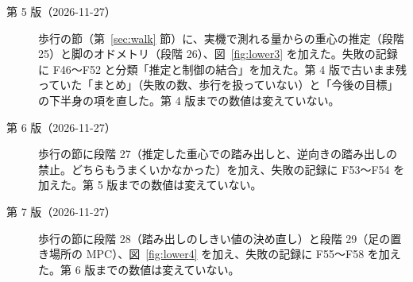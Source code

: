 \documentclass[paper=a4paper,fontsize=10pt,twocolumn,column_gap=2zw,line_length=24zw,number_of_lines=46,head_space=20mm]{jlreq}
\begin{document}
\begin{description}
\item[第 5 版（2026-11-27）] 歩行の節（第~\ref{sec:walk} 節）に、実機で測れる量からの重心の推定（段階 25）と脚のオドメトリ（段階 26）、図~\ref{fig:lower3} を加えた。失敗の記録に F46〜F52 と分類「推定と制御の結合」を加えた。第 4 版で古いまま残っていた「まとめ」（失敗の数、歩行を扱っていない）と「今後の目標」の下半身の項を直した。第 4 版までの数値は変えていない。
\item[第 6 版（2026-11-27）] 歩行の節に段階 27（推定した重心での踏み出しと、逆向きの踏み出しの禁止。どちらもうまくいかなかった）を加え、失敗の記録に F53〜F54 を加えた。第 5 版までの数値は変えていない。
\item[第 7 版（2026-11-27）] 歩行の節に段階 28（踏み出しのしきい値の決め直し）と段階 29（足の置き場所の MPC）、図~\ref{fig:lower4} を加え、失敗の記録に F55〜F58 を加えた。第 6 版までの数値は変えていない。
\end{description}
\end{document}
